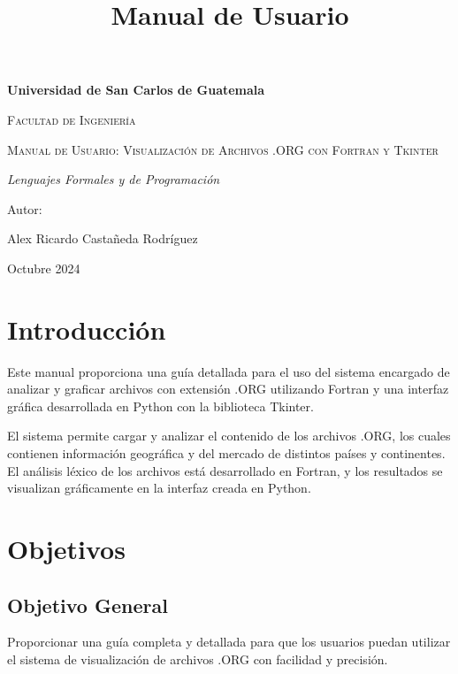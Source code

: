 \documentclass[12pt, letterpaper, twosite]{article}
\date{}
\title{Manual de Usuario}
\begin{document}
\begin{titlepage}
      \centering
      \vspace{1cm}
      {\bfseries\LARGE Universidad de San Carlos de Guatemala \par}
      \vspace{1cm}
      {\scshape\Large Facultad de Ingeniería \par}
      \vspace{3cm}
      {\scshape\Huge Manual de Usuario: Visualización de Archivos .ORG con Fortran y Tkinter \par}
      \vspace{3cm}
      {\itshape\Large Lenguajes Formales y de Programación \par}
      \vfill
      {\Large Autor: \par}
      {\Large Alex Ricardo Castañeda Rodríguez \par}
      \vfill
      {\Large Octubre 2024 \par}
\end{titlepage}

\tableofcontents

\newpage

\section{Introducción}
\label{sec:1}

Este manual proporciona una guía detallada para el uso del sistema encargado de analizar y graficar archivos con extensión .ORG utilizando Fortran y una interfaz gráfica desarrollada en Python con la biblioteca Tkinter.

El sistema permite cargar y analizar el contenido de los archivos .ORG, los cuales contienen información geográfica y del mercado de distintos países y continentes. El análisis léxico de los archivos está desarrollado en Fortran, y los resultados se visualizan gráficamente en la interfaz creada en Python.

\section{Objetivos}
\subsection{Objetivo General}
Proporcionar una guía completa y detallada para que los usuarios puedan utilizar el sistema de visualización de archivos .ORG con facilidad y precisión.
\end{document}
